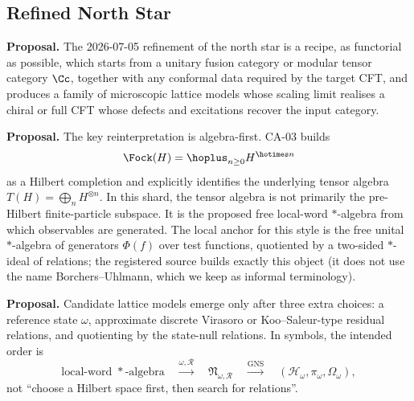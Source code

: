 
\subsection{Refined North Star}

\textbf{Proposal.}  The 2026-07-05 refinement of the north star is a recipe, as
functorial as possible, which starts from a unitary fusion category or modular
tensor category \(\Cc\), together with any conformal data required by the target
CFT, and produces a family of microscopic lattice models whose scaling limit
realises a chiral or full CFT whose defects and excitations recover the input
category.

\textbf{Proposal.}  The key reinterpretation is algebra-first.  CA-03 builds
\[
  \Fock(H)=\hoplus_{n\ge0}H^{\hotimes n}
\]
as a Hilbert completion and explicitly identifies the underlying tensor
algebra \(T(H)=\bigoplus_n H^{\otimes n}\).  In this shard, the tensor algebra
is not primarily the pre-Hilbert finite-particle subspace.  It is the proposed
free local-word \(*\)-algebra from which observables are generated.  The local
anchor for this style is the free unital \(*\)-algebra of generators
\(\Phi(f)\) over test functions, quotiented by a two-sided \(*\)-ideal of
relations; the registered source builds exactly this object (it does not use
the name Borchers--Uhlmann, which we keep as informal terminology).

\textbf{Proposal.}  Candidate lattice models emerge only after three extra
choices: a reference state \(\omega\), approximate discrete Virasoro or
Koo--Saleur-type residual relations, and quotienting by the state-null
relations.  In symbols, the intended order is
\[
  \text{local-word } *\text{-algebra}
  \quad\stackrel{\omega,\mathcal R}{\longrightarrow}\quad
  \mathfrak N_{\omega,\mathcal R}
  \quad\stackrel{\mathrm{GNS}}{\longrightarrow}\quad
  (\mathcal H_\omega,\pi_\omega,\Omega_\omega),
\]
not ``choose a Hilbert space first, then search for relations''.

